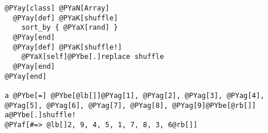 \begin{Verbatim}[commandchars=@\[\]]
@PYay[class] @PYaN[Array]
  @PYay[def] @PYaK[shuffle]
    sort_by { @PYaX[rand] }
  @PYay[end]
  @PYay[def] @PYaK[shuffle!]
    @PYaX[self]@PYbe[.]replace shuffle
  @PYay[end]
@PYay[end]

a @PYbe[=] @PYbe[@lb[]]@PYag[1], @PYag[2], @PYag[3], @PYag[4], @PYag[5], @PYag[6], @PYag[7], @PYag[8], @PYag[9]@PYbe[@rb[]]
a@PYbe[.]shuffle!
@PYaf[#=> @lb[]2, 9, 4, 5, 1, 7, 8, 3, 6@rb[]]
\end{Verbatim}
